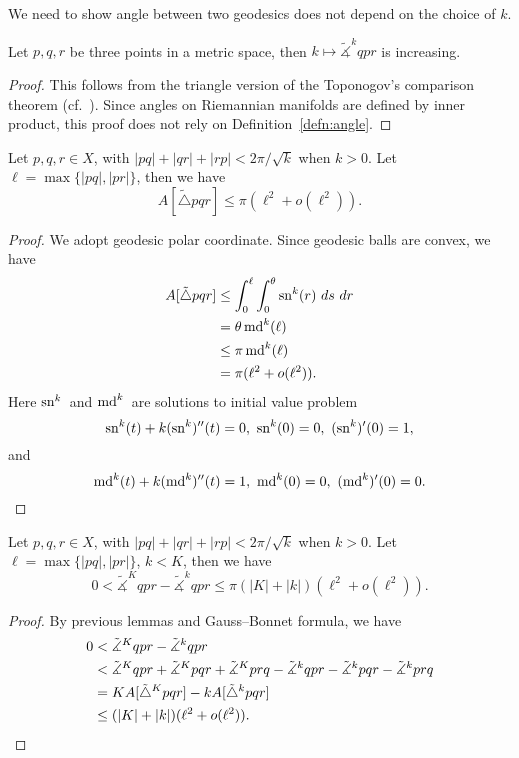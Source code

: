 We need to show angle between two geodesics does not depend on the choice of $k$.

\begin{lem}
    Let $p,q,r$ be three points in a metric space, then $k\mapsto\tilde{\measuredangle}^kqpr$ is increasing.
\end{lem}
\begin{proof}
    This follows from the triangle version of the Toponogov's comparison theorem (cf.~\cite[Theorem 12.2.2]{petersenRiemannianGeometry2016}).
    Since angles on Riemannian manifolds are defined by inner product, this proof does not rely on Definition~\ref{defn:angle}.
\end{proof}

\begin{lem}
    Let $p,q,r\in X$, with $|pq|+|qr|+|rp|<2\pi/\sqrt{k}$ when $k>0$.
    Let $\ell=\max\{|pq|,|pr|\}$, then we have
    \[A[\tilde{\triangle}pqr]\leq\pi(\ell^2+o(\ell^2)).\]
\end{lem}
\begin{proof}
    We adopt geodesic polar coordinate.
    Since geodesic balls are convex, we have
    \begin{align*}
        A[\tilde{\triangle}pqr]&\leq\int_{0}^{\ell}\int_{0}^{\theta}\sn^k(r)\ ds\ dr\\
        &=\theta\md^k(\ell)\\
        &\leq\pi\md^k(\ell)\\
        &=\pi(\ell^2+o(\ell^2)).
    \end{align*}
    Here $\operatorname{sn}^k{}$ and $\operatorname{md}^k{}$ are solutions to initial value problem
    \[\sn^k(t)+k(\sn^k)''(t)=0,\ \sn^k(0)=0,\ (\sn^k)'(0)=1,\]
    and
    \[\md^k(t)+k(\md^k)''(t)=1,\ \md^k(0)=0,\ (\md^k)'(0)=0.\qedhere\]
\end{proof}

\begin{lem}
    Let $p,q,r\in X$, with $|pq|+|qr|+|rp|<2\pi/\sqrt{k}$ when $k>0$.
    Let $\ell=\max\{|pq|,|pr|\}$, $k<K$, then we have
    \begin{equation}
        0<\tilde{\measuredangle}^Kqpr-\tilde{\measuredangle}^kqpr\leq\pi(|K|+|k|)(\ell^2+o(\ell^2)).\label{eq:lem angle}
    \end{equation}
\end{lem}
\begin{proof}
    By previous lemmas and Gauss--Bonnet formula, we have
    \begin{align*}
        0&<\tilde{\measuredangle}^Kqpr-\tilde{\measuredangle}^kqpr\\
        &<\tilde{\measuredangle}^Kqpr+\tilde{\measuredangle}^Kpqr+\tilde{\measuredangle}^Kprq-\tilde{\measuredangle}^kqpr-\tilde{\measuredangle}^kpqr-\tilde{\measuredangle}^kprq\\
        &=KA[\tilde{\triangle}^Kpqr]-kA[\tilde{\triangle}^kpqr]\\
        &\leq(|K|+|k|)(\ell^2+o(\ell^2)).\qedhere
    \end{align*}
\end{proof}

